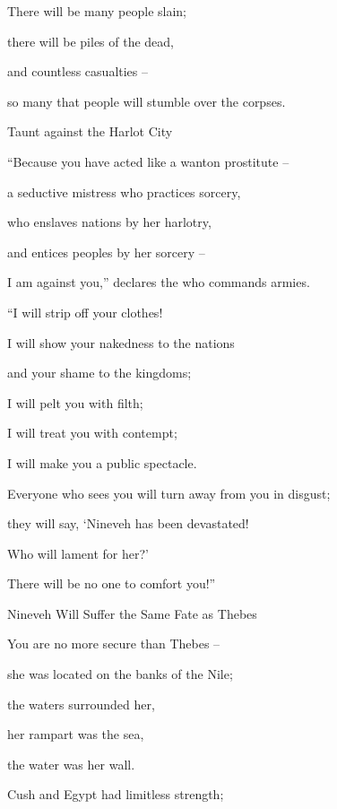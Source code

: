 {\par }{\Q There will be many people
slain;
\par }{\Q there will be piles
of the dead,
\par }{\Q and countless
casualties –
\par }{\Q so many that people will stumble
over the corpses.
\par }{\SH Taunt against the Harlot City
\par }{\Q {}“Because you have acted like
a wanton
prostitute –
\par }{\Q a seductive
mistress who practices
sorcery,
\par }{\Q who enslaves
nations
by her harlotry,
\par }{\Q and entices peoples
by her sorcery –
\par }{\Q {}I am against
you,” declares
the {}
who commands armies.
\par }{\Q “I will strip off
your clothes!

\par }{\Q I will show
your nakedness
to the nations
\par }{\Q and your shame
to the kingdoms;
\par }{\Q {}I will pelt
you with filth;
\par }{\Q I will treat you with contempt;
\par }{\Q I will make
you a public spectacle.
\par }{\Q {}Everyone
who sees
you will turn away from
you in disgust;
\par }{\Q they will say,
‘Nineveh
has been devastated!
\par }{\Q Who
will lament for
her?’
\par }{\Q There will be
no one to comfort you!”
\par }{\SH Nineveh Will Suffer the Same Fate as Thebes
\par }{\Q {}You are no more secure
than Thebes –
\par }{\Q she was located
on the banks of the Nile;
\par }{\Q the waters
surrounded
her,
\par }{\Q her rampart
was the sea,
\par }{\Q the water
was her wall.
\par }{\Q {}Cush
and Egypt
had limitless
strength;

}
